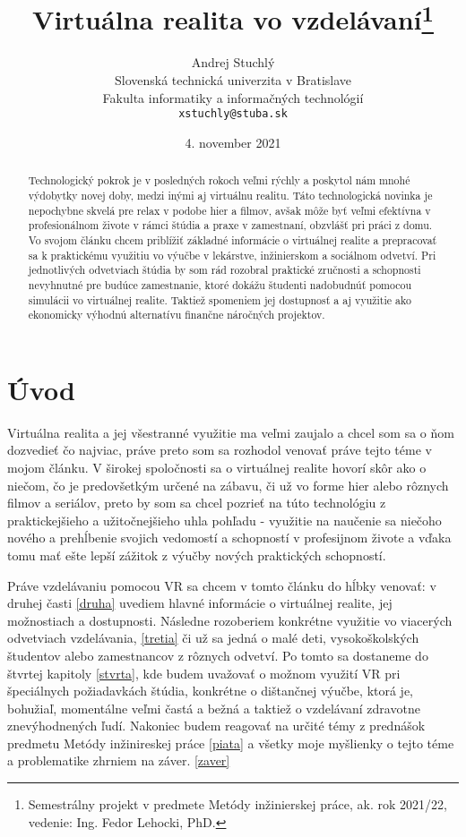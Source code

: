 \documentclass[10pt,twoside,slovak,a4paper]{article}
\title{Virtuálna realita vo vzdelávaní\thanks{Semestrálny projekt v predmete Metódy inžinierskej práce, ak. rok 2021/22, vedenie: Ing. Fedor Lehocki, PhD.}}
\author{Andrej Stuchlý\\[2pt]
	{\small Slovenská technická univerzita v Bratislave}\\
	{\small Fakulta informatiky a informačných technológií}\\
	{\small \texttt{xstuchly@stuba.sk}}
	}
\date{\small 4. november 2021}
\begin{document}
\maketitle

\begin{abstract}
Technologický pokrok je v posledných rokoch veľmi rýchly a poskytol nám mnohé výdobytky novej doby, medzi inými aj virtuálnu realitu. Táto technologická novinka je nepochybne skvelá pre relax v podobe hier a filmov, avšak môže byť veľmi efektívna v profesionálnom živote v rámci štúdia a praxe v zamestnaní, obzvlášť pri práci z domu. Vo svojom článku chcem priblížiť základné informácie o virtuálnej realite a prepracovať sa k  praktickému využitiu vo výučbe v lekárstve, inžinierskom a sociálnom odvetví. Pri jednotlivých odvetviach štúdia by som rád rozobral praktické zručnosti a schopnosti nevyhnutné pre budúce zamestnanie, ktoré dokážu študenti nadobudnúť pomocou simulácii vo virtuálnej realite. Taktiež spomeniem jej dostupnosť a aj využitie ako ekonomicky výhodnú alternatívu finančne náročných projektov. 
\end{abstract}


\section{Úvod}
Virtuálna realita a jej všestranné využitie ma veľmi zaujalo a chcel som sa o ňom dozvedieť čo najviac, práve preto som sa rozhodol venovať práve tejto téme v mojom článku. V širokej spoločnosti sa o virtuálnej realite hovorí skôr ako o niečom, čo je predovšetkým určené na zábavu, či už vo forme hier alebo rôznych filmov a seriálov, preto by som sa chcel pozrieť na túto technológiu z praktickejšieho a užitočnejšieho uhla pohľadu - využitie na naučenie sa niečoho nového a prehĺbenie svojich vedomostí a schopností v profesijnom živote a vďaka tomu mať ešte lepší zážitok z výučby nových praktických schopností.

Práve vzdelávaniu pomocou VR sa chcem v tomto článku do hĺbky venovať: v druhej časti \ref{druha} uvediem hlavné informácie o virtuálnej realite, jej možnostiach a dostupnosti. Následne rozoberiem konkrétne využitie vo viacerých odvetviach vzdelávania, \ref{tretia} či už sa jedná o malé deti, vysokoškolských študentov alebo zamestnancov z rôznych odvetví. Po tomto sa dostaneme do štvrtej kapitoly \ref{stvrta}, kde budem uvažovať o možnom využití VR pri špeciálnych požiadavkách štúdia, konkrétne o dištančnej výučbe, ktorá je, bohužiaľ, momentálne veľmi častá a bežná a taktiež o vzdelávaní zdravotne znevýhodnených ľudí. Nakoniec budem reagovať na určité témy z prednášok predmetu Metódy inžinireskej práce \ref{piata} a všetky moje myšlienky o tejto téme a problematike zhrniem na záver. \ref{zaver}
\end{document}
